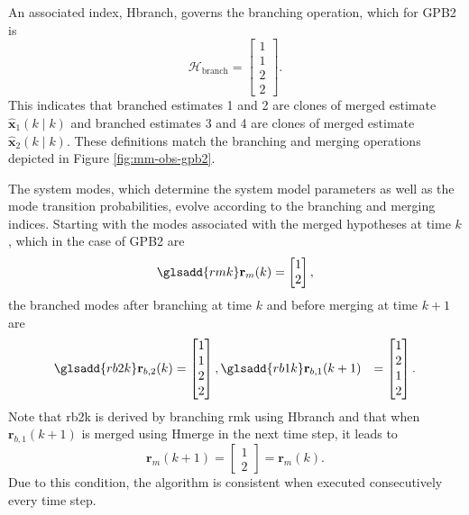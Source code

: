 An associated index, \gls{Hbranch}, governs the branching operation, which for \gls{GPB2} is
\begin{equation} \label{eq:Hbranch_GPB2}
	\mathcal{H}_{\text{branch}} = \begin{bmatrix} 1 \\ 1 \\ 2 \\ 2 \end{bmatrix}.
\end{equation}
This indicates that branched estimates 1 and 2 are clones of merged estimate $\mathbf{\hat{x}}_1(k \mid k)$ and branched estimates 3 and 4 are clones of merged estimate $\mathbf{\hat{x}}_2(k \mid k)$. These definitions match the branching and merging operations depicted in Figure \ref{fig:mm-obs-gpb2}.

The system modes, which determine the system model parameters as well as the mode transition probabilities, evolve according to the branching and merging indices. Starting with the modes associated with the merged hypotheses at time $k$, which in the case of GPB2 are
\begin{equation} \label{eq:rmk_GPB2}
		\glsadd{rmk}\mathbf{r}_m(k) = \begin{bmatrix} 1 \\ 2 \end{bmatrix},
\end{equation}
the branched modes after branching at time $k$ and before merging at time $k+1$ are
\begin{equation} \label{eq:rbk_GPB2}
	\begin{aligned}
		\glsadd{rb2k}\mathbf{r}_{b,2}(k) &= \begin{bmatrix} 1 \\ 1 \\ 2 \\ 2 \end{bmatrix},
		\glsadd{rb1k}\mathbf{r}_{b,1}(k+1) &= \begin{bmatrix} 1 \\ 2 \\ 1 \\ 2 \end{bmatrix}.
	\end{aligned}
\end{equation}
Note that \gls{rb2k} is derived by branching \gls{rmk} using \gls{Hbranch} and that when $\mathbf{r}_{b,1}(k+1)$ is merged using \gls{Hmerge} in the next time step, it leads to 
\begin{equation} \label{eq:rmkp1rmk_GPB2}
	\mathbf{r}_m(k+1) = \begin{bmatrix} 1 \\ 2 \end{bmatrix} = \mathbf{r}_m(k).
\end{equation}
Due to this condition, the algorithm is consistent when executed consecutively every time step.

